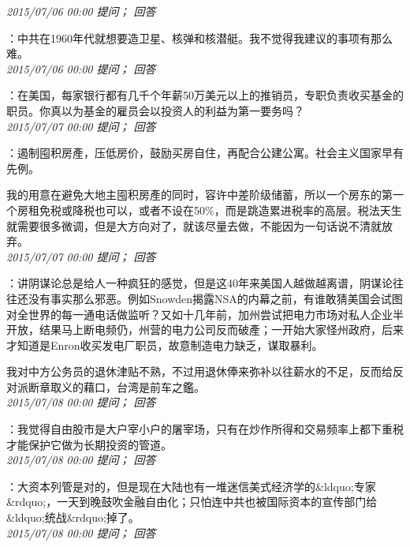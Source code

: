 \documentclass[twocolumn]{ctexart}
\begin{document}
\textit{\hfill\noindent\small 2015/07/06 00:00 提问； 回答}

：中共在1960年代就想要造卫星、核弹和核潜艇。我不觉得我建议的事项有那么难。\\

\textit{\hfill\noindent\small 2015/07/06 00:00 提问； 回答}

：在美国，每家银行都有几千个年薪50万美元以上的推销员，专职负责收买基金的职员。你真以为基金的雇员会以投资人的利益为第一要务吗？\\

\textit{\hfill\noindent\small 2015/07/07 00:00 提问； 回答}

：遏制囤积房產，压低房价，鼓励买房自住，再配合公建公寓。社会主义国家早有先例。

我的用意在避免大地主囤积房產的同时，容许中差阶级储蓄，所以一个房东的第一个房租免税或降税也可以，或者不设在50\%，而是跳造累进税率的高层。税法天生就需要很多微调，但是大方向对了，就该尽量去做，不能因为一句话说不清就放弃。\\

\textit{\hfill\noindent\small 2015/07/07 00:00 提问； 回答}

：讲阴谋论总是给人一种疯狂的感觉，但是这40年来美国人越做越离谱，阴谋论往往还没有事实那么邪恶。例如Snowden揭露NSA的内幕之前，有谁敢猜美国会试图对全世界的每一通电话做监听？又如十几年前，加州尝试把电力市场对私人企业半开放，结果马上断电频仍，州营的电力公司反而破產；一开始大家怪州政府，后来才知道是Enron收买发电厂职员，故意制造电力缺乏，谋取暴利。

我对中方公务员的退休津贴不熟，不过用退休俸来弥补以往薪水的不足，反而给反对派断章取义的藉口，台湾是前车之鑑。\\

\textit{\hfill\noindent\small 2015/07/08 00:00 提问； 回答}

：我觉得自由股市是大户宰小户的屠宰场，只有在炒作所得和交易频率上都下重税才能保护它做为长期投资的管道。\\

\textit{\hfill\noindent\small 2015/07/08 00:00 提问； 回答}

：大资本列管是对的，但是现在大陆也有一堆迷信美式经济学的\&ldquo;专家\&rdquo;，一天到晚鼓吹金融自由化；只怕连中共也被国际资本的宣传部门给\&ldquo;统战\&rdquo;掉了。\\

\textit{\hfill\noindent\small 2015/07/08 00:00 提问； 回答}
\end{document}
